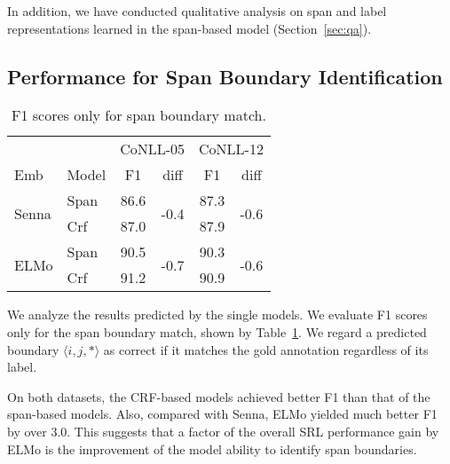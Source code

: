 \documentclass[11pt,a4paper]{article}
\begin{document}
\noindent
In addition, we have conducted qualitative analysis on span and label representations learned in the span-based model (Section~\ref{sec:qa}).

\subsection{Performance for Span Boundary Identification}
\label{sec:sbi}
\begin{table}[t]
  \centering
  {\small
  \begin{tabular}{llcccc} \toprule
                  & & \multicolumn{2}{c}{CoNLL-05} & \multicolumn{2}{c}{CoNLL-12} \\
                  {\sc Emb}& {\sc Model} & F1 & diff & F1 & diff \\ \hline
\multirow{2}{*}{\sc Senna} & {\sc Span}    & 86.6 & \multirow{2}{*}{-0.4}& 87.3 & \multirow{2}{*}{-0.6} \\
 & {\sc Crf}       & 87.0 &  & 87.9 & \\ \hline
\multirow{2}{*}{\sc ELMo} & {\sc Span}     & 90.5 & \multirow{2}{*}{-0.7} & 90.3 &\multirow{2}{*}{-0.6}  \\
 & {\sc Crf}        & 91.2 &   & 90.9 &  \\ \toprule
  \end{tabular}
  }
  \caption{\label{tab:span-identification} F1 scores only for span boundary match.}
\end{table}

We analyze the results predicted  by the single models.
We evaluate F1 scores only for the span boundary match, shown by Table~\ref{tab:span-identification}.
We regard a predicted boundary $\langle i, j, * \rangle$ as correct if it matches the gold annotation regardless of its label.

On both datasets, the CRF-based models achieved better F1 than that of the span-based models.
Also, compared with {\sc Senna}, {\sc ELMo} yielded much better F1 by over 3.0.
This suggests that a factor of the overall SRL performance gain by {\sc ELMo} is the improvement of the model ability to identify span boundaries.
\end{document}

